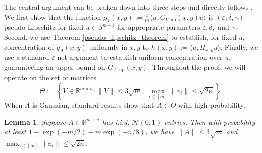 \documentclass[11pt]{article}
\newcommand{\R}{\mathbb{R}}
\newcommand{\N}{\mathcal{N}}
\newcommand{\Scal}{\mathcal{S}}
\renewcommand{\epsilon}{\varepsilon}
\newtheorem{lemma}{Lemma}
\begin{document}
The central argument can be broken down into three steps and directly follows \cite{Daskalaskisetal2020}. We first show that the function $g_V(x,y) := \frac{1}{m}\langle u, G_{V,\text{up}}(x,y)u\rangle$ is $(\epsilon,\delta,\gamma)$-pseudo-Lipschitz for fixed $u \in \Scal^{n-1}$ for appropriate parameters $\epsilon,\delta,$ and $\gamma$. Second, we use Theorem \ref{pseudo_lipschitz_theorem} to establish, for fixed $u$, concentration of $g_A(x,y)$ uniformly in $x,y$ to $h(x,y) := \langle u, H_{x,y}u\rangle$. Finally, we use a standard $\epsilon$-net argument to establish uniform concentration over $u$, guaranteeing an upper bound on $G_{A,\text{up}}(x,y)$. Throughout the proof, we will operate on the set of matrices $$\Theta := \left\{V \in \R^{m \times n} : \|V\| \leqslant 3\sqrt{m},\ \max_{i \in [m]}\|v_i\|\leqslant \sqrt{2n}\right\}.$$ When $A$ is Gaussian, standard results \cite{Vershynin_notes} show that $A \in \Theta$ with high probability. 
\begin{lemma} \cite{Vershynin_notes} \label{A_in_theta}
Suppose $A \in \R^{m \times n}$ has i.i.d. $\N(0,1)$ entries. Then with probability at least $1 - \exp(-m/2) - m\exp(-n/8)$, we have $\|A\| \leqslant 3\sqrt{m}$ and $\max_{i \in [m]}\|a_i\|\leqslant \sqrt{2n}$.
\end{lemma}
\end{document}
